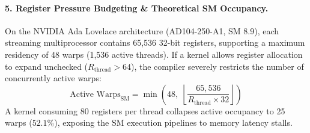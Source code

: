 \paragraph{5. Register Pressure Budgeting \& Theoretical SM Occupancy.}
On the NVIDIA Ada Lovelace architecture (AD104-250-A1, SM 8.9), each streaming multiprocessor contains 65,536 32-bit registers, supporting a maximum residency of 48 warps (1,536 active threads). If a kernel allows register allocation to expand unchecked ($R_{\text{thread}} > 64$), the compiler severely restricts the number of concurrently active warps:
\begin{equation}
\label{eq:occupancy_equation}
\text{Active Warps}_{\text{SM}} = \min \left( 48, \; \left\lfloor \frac{65{,}536}{R_{\text{thread}} \times 32} \right\rfloor \right)
\end{equation}
A kernel consuming 80 registers per thread collapses active occupancy to 25 warps ($52.1\%$), exposing the SM execution pipelines to memory latency stalls.


